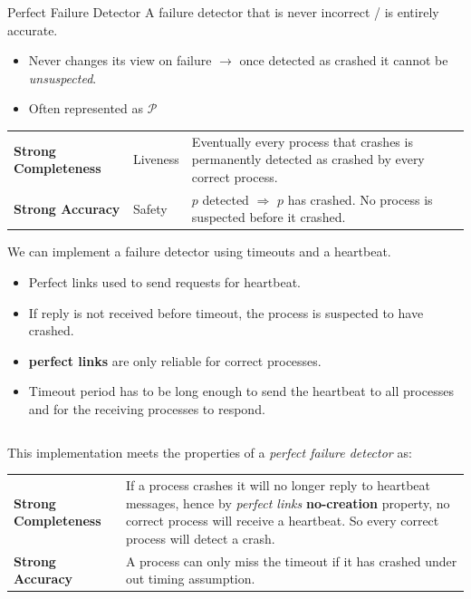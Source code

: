 \begin{definitionbox}{Perfect Failure Detector}
  A failure detector that is never incorrect / is entirely accurate.
  \begin{itemize}
    \item Never changes its view on failure $\to$ once detected as crashed it cannot be \textit{unsuspected}.
    \item Often represented as $\mathcal{P}$
  \end{itemize}
  \begin{center}
    \begin{tabular}{l l p{}}
      \textbf{Strong Completeness} & Liveness & Eventually every process that crashes is permanently detected as crashed by every correct process. \\
      \textbf{Strong Accuracy} & Safety & $p$ detected $\Rightarrow$ $p$ has crashed. No process is suspected before it crashed. \\
    \end{tabular}
\end{center}
\end{definitionbox}

We can implement a failure detector using timeouts and a heartbeat.
\begin{itemize}
  \item Perfect links used to send requests for heartbeat.
  \item If reply is not received before timeout, the process is suspected to have crashed.
  \item \textbf{perfect links} are only reliable for correct processes.
  \item Timeout period has to be long enough to send the heartbeat to all processes and for the receiving processes to respond. 
\end{itemize} 
\inputminted{elixir}{reliable_broadcast/code/perfect_failure_detector.ex}

This implementation meets the properties of a \textit{perfect failure detector} as:
\begin{center}
  \begin{tabular}{l p{}}
    \textbf{Strong Completeness} & {If a process crashes it will no longer reply to heartbeat messages, 
    hence by \textit{perfect links} \textbf{no-creation} property, no correct process will receive 
    a heartbeat. So every correct process will detect a crash. } \\
    \textbf{Strong Accuracy} & A process can only miss the timeout if it has crashed under out timing assumption.
  \end{tabular}
\end{center}

